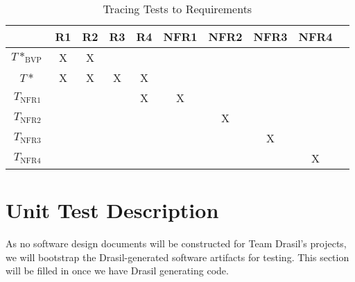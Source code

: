 \documentclass[12pt, titlepage]{article}
\begin{document}
\begin{longtable}{|c|c|c|c|c|c|c|c|c|c|}
    \caption{Tracing Tests to Requirements}
    \label{tab:trace_tests_to_reqs} \\
    
    \hline

                    & R1 & R2 & R3 & R4 & NFR1 & NFR2 & NFR3 & NFR4 \\ \hline
    $T*_\text{BVP}$ & X  & X  &    &    &      &      &      &      \\ \hline
    $T*$            & X  & X  & X  & X  &      &      &      &      \\ \hline
    $T_\text{NFR1}$ &    &    &    & X  & X    &      &      &      \\ \hline
    $T_\text{NFR2}$ &    &    &    &    &      & X    &      &      \\ \hline
    $T_\text{NFR3}$ &    &    &    &    &      &      & X    &      \\ \hline
    $T_\text{NFR4}$ &    &    &    &    &      &      &      & X    \\ \hline

\end{longtable}

\newpage{}

\section{Unit Test Description}
\label{sec:unit_test_description}

As no software design documents will be constructed for Team Drasil's projects,
we will bootstrap the Drasil-generated software artifacts for testing. This
section will be filled in once we have Drasil generating code.


\newpage{}

\printbibliography{}


\newpage{}
\end{document}
